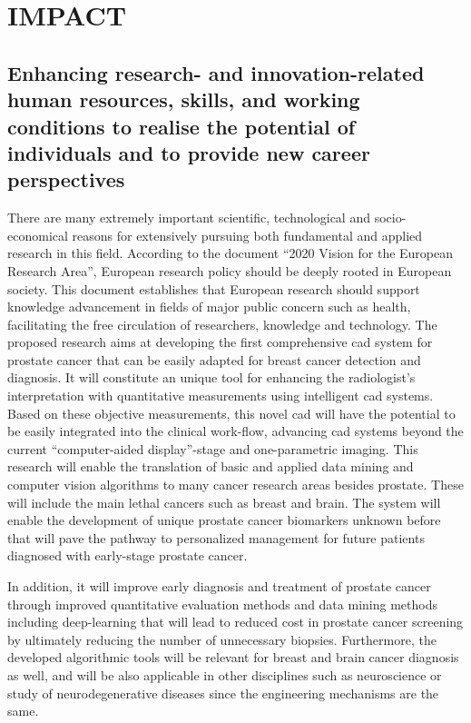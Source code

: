 \section{IMPACT}
\label{sec:impact}

\subsection{Enhancing research- and innovation-related human resources, skills, and working conditions to realise the potential of individuals and to provide new career perspectives}
\label{sec:enhancement}

There are many extremely important scientific, technological and socio-economical reasons for extensively pursuing both fundamental and applied research in this field.
According to the document ``2020 Vision for the European Research Area'', European research policy should be deeply rooted in European society.
This document establishes that European research should support knowledge advancement in fields of major public concern such as health, facilitating the free circulation of researchers, knowledge and technology.
The proposed research aims at developing the first comprehensive \ac{cad} system for prostate cancer that can be easily adapted for breast cancer detection and diagnosis.
It will constitute an unique tool for enhancing the radiologist's interpretation with quantitative measurements using intelligent \ac{cad} systems.
Based on these objective measurements, this novel \ac{cad} will have the potential to be easily integrated into the clinical work-flow, advancing \ac{cad} systems beyond the current ``computer-aided display''-stage and one-parametric imaging.
This research will enable the translation of basic and applied data mining and computer vision algorithms to many cancer research areas besides prostate. 
These will include the main lethal cancers such as breast and brain.
The system will enable the development of unique prostate cancer biomarkers unknown before that will pave the pathway to personalized management for future patients diagnosed with early-stage prostate cancer.

In addition, it will improve early diagnosis and treatment of prostate cancer through improved quantitative evaluation methods and data mining methods including deep-learning that will lead to reduced cost in prostate cancer screening by ultimately reducing the number of unnecessary biopsies.
Furthermore, the developed algorithmic tools will be relevant for breast and brain cancer diagnosis as well, and will be also applicable in other disciplines such as neuroscience or study of neurodegenerative diseases since the engineering mechanisms are the same.

